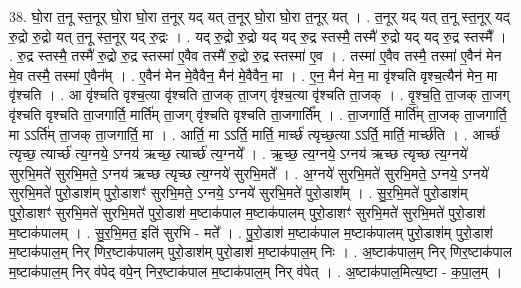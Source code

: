 \documentclass[17pt]{extarticle}
\begin{document}
38. घो॒रा त॒नू स्त॒नूर् घो॒रा घो॒रा त॒नूर् यद् यत् त॒नूर् घो॒रा घो॒रा त॒नूर् यत् । . त॒नूर् यद् यत् त॒नू स्त॒नूर् यद् रु॒द्रो रु॒द्रो यत् त॒नू स्त॒नूर् यद् रु॒द्रः । . यद् रु॒द्रो रु॒द्रो यद् यद् रु॒द्र स्तस्मै॒ तस्मै॑ रु॒द्रो यद् यद् रु॒द्र स्तस्मै᳚ । . रु॒द्र स्तस्मै॒ तस्मै॑ रु॒द्रो रु॒द्र स्तस्मा॑ ए॒वैव तस्मै॑ रु॒द्रो रु॒द्र स्तस्मा॑ ए॒व । . तस्मा॑ ए॒वैव तस्मै॒ तस्मा॑ ए॒वैन॑ मेन मे॒व तस्मै॒ तस्मा॑ ए॒वैन᳚म् । . ए॒वैन॑ मेन मे॒वैवैन॒ मैन॑ मे॒वैवैन॒ मा । . ए॒न॒ मैन॑ मेन॒ मा वृ॑श्चति वृश्च॒त्यैन॑ मेन॒ मा वृ॑श्चति । . आ वृ॑श्चति वृश्च॒त्या वृ॑श्चति ता॒जक् ता॒जग् वृ॑श्च॒त्या वृ॑श्चति ता॒जक् । . वृ॒श्च॒ति॒ ता॒जक् ता॒जग् वृ॑श्चति वृश्चति ता॒जगार्ति॒ मार्ति॑म् ता॒जग् वृ॑श्चति वृश्चति ता॒जगार्ति᳚म् । . ता॒जगार्ति॒ मार्ति॑म् ता॒जक् ता॒जगार्ति॒ मा ऽऽर्ति॑म् ता॒जक् ता॒जगार्ति॒ मा । . आर्ति॒ मा ऽऽर्ति॒ मार्ति॒ मार्च्छ॑ त्यृच्छ॒त्या ऽऽर्ति॒ मार्ति॒ मार्च्छ॑ति । . आर्च्छ॑ त्यृच्छ॒ त्यार्च्छ॑ त्य॒ग्नये॒ ऽग्नय॑ ऋच्छ॒ त्यार्च्छ॑ त्य॒ग्नये᳚ । . ऋ॒च्छ॒ त्य॒ग्नये॒ ऽग्नय॑ ऋच्छ त्यृच्छ त्य॒ग्नये॑ सुरभि॒मते॑ सुरभि॒मते॒ ऽग्नय॑ ऋच्छ त्यृच्छ त्य॒ग्नये॑ सुरभि॒मते᳚ । . अ॒ग्नये॑ सुरभि॒मते॑ सुरभि॒मते॒ ऽग्नये॒ ऽग्नये॑ सुरभि॒मते॑ पुरो॒डाश॑म् पुरो॒डाशꣳ॑ सुरभि॒मते॒ ऽग्नये॒ ऽग्नये॑ सुरभि॒मते॑ पुरो॒डाश᳚म् । . सु॒र॒भि॒मते॑ पुरो॒डाश॑म् पुरो॒डाशꣳ॑ सुरभि॒मते॑ सुरभि॒मते॑ पुरो॒डाश॑ म॒ष्टाक॑पाल म॒ष्टाक॑पालम् पुरो॒डाशꣳ॑ सुरभि॒मते॑ सुरभि॒मते॑ पुरो॒डाश॑ म॒ष्टाक॑पालम् । . सु॒र॒भि॒मत॒ इति॑ सुरभि - मते᳚ । . पु॒रो॒डाश॑ म॒ष्टाक॑पाल म॒ष्टाक॑पालम् पुरो॒डाश॑म् पुरो॒डाश॑ म॒ष्टाक॑पाल॒म् निर् णिर॒ष्टाक॑पालम् पुरो॒डाश॑म् पुरो॒डाश॑ म॒ष्टाक॑पाल॒म् निः । . अ॒ष्टाक॑पाल॒म् निर् णिर॒ष्टाक॑पाल म॒ष्टाक॑पाल॒म् निर् व॑पेद् वपे॒न् निर॒ष्टाक॑पाल म॒ष्टाक॑पाल॒म् निर् व॑पेत् । . अ॒ष्टाक॑पाल॒मित्य॒ष्टा - क॒पा॒ल॒म् । \newline
\end{document}
